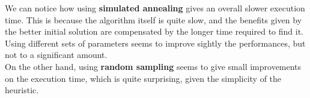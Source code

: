 \documentclass[
12pt,
a4paper,
oneside,
headinclude,
footinclude]{article}
\begin{document}
    We can notice how using \textbf{simulated annealing} gives an overall slower execution time. This is because the algorithm itself is quite slow, and the benefits given by the better initial solution are compensated by the longer time required to find it.\\
    Using different sets of parameters seems to improve sightly the performances, but not to a significant amount.\\ 
    On the other hand, using \textbf{random sampling} seems to give small improvements on the execution time, which is quite surprising, given the simplicity of the heuristic.
\end{document}
